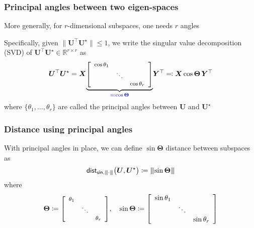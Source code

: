 \documentclass[compress,
mathserif,wide,%
]{beamer}
\begin{document}
\begin{frame}
\frametitle{Principal angles between two eigen-spaces}


More generally, for $r$-dimensional subspaces, one needs $r$ angles

\bigskip
\bigskip


Specifically, given $\|\bm{U}^{\top}\bm{U}^{\star}\| \leq 1$, we  write the singular value decomposition (SVD) of $\bm{U}^{\top}\bm{U}^{\star} \in\mathbb{R}^{r\times r}$ as
%
\[
	\bm{U}^{\top}\bm{U}^{\star}
	=\bm{X} {\footnotesize  \underset{\textcolor{blue}{ \eqqcolon\cos \bm{\Theta}}}{\underbrace{ \left[\begin{array}{ccc}
		\cos\theta_{1}\\
 		& \ddots\\
 		&  & \cos\theta_{r}
	\end{array}\right]} }}
	\bm{Y}^{\top} \eqqcolon \bm{X}\cos\bm{\Theta}\,\bm{Y}^{\top}
\]
%
where $\{\theta_{1},\ldots,\theta_{r}\}$ are called the \alert{principal angles}
between $\bm{U}$ and $\bm{U}^\star$

\end{frame}


\begin{frame}
	\frametitle{Distance using principal angles}
With principal angles in place, we can define $\sin\bm{\Theta}$ distance between subspaces as
	\begin{equation*}
	\mathsf{dist}_{\mathsf{sin},{\left\vert\kern-0.25ex\left\vert\kern-0.25ex\left\vert \cdot \right\vert\kern-0.25ex\right\vert\kern-0.25ex\right\vert}}\big(\bm{U}, {\bm{U}}^{\star} \big) \coloneqq {\left\vert\kern-0.25ex\left\vert\kern-0.25ex\left\vert \sin\bm{\Theta} \right\vert\kern-0.25ex\right\vert\kern-0.25ex\right\vert}
\end{equation*}
where
%
\begin{equation*}
	\bm{\Theta}\coloneqq {\footnotesize \left[\begin{array}{ccc}
\theta_{1}\\
 & \ddots\\
 &  & \theta_{r}
	\end{array}\right] }
	,\quad
	\sin\bm{\Theta}\coloneqq { \left[\begin{array}{ccc}
\sin\theta_{1}\\
 & \ddots\\
 &  & \sin\theta_{r}
	\end{array}\right] } 
	\label{eq:defn-Theta-sin-Theta}
\end{equation*}
\end{frame}
\end{document}
